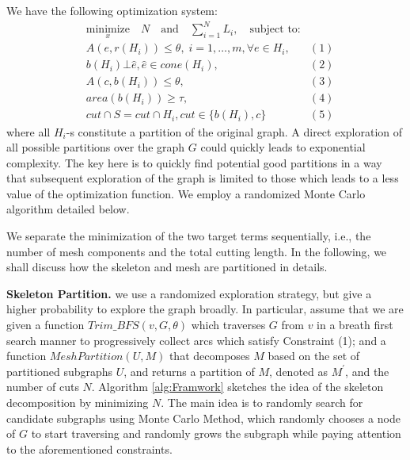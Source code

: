 We have the following optimization system:
\begin{equation*}
\begin{aligned}
& \underset{x}{\text{minimize}} \quad N \quad \text{and} \quad \sum_{i=1}^N{L_i},
\quad \text{subject to:} \\
& A(e, r(H_i)) \leq \theta, \; i = 1, \ldots, m, \forall e \in H_i, & (1)\\
& b(H_i) \bot \hat{e}, \hat{e} \in cone(H_i), & (2)\\
& A(c, b(H_i)) \leq \theta, & (3)\\
& area(b(H_i)) \geq \tau, & (4)\\
& cut \cap S = cut \cap H_i, cut \in \{b(H_i), c\}  & (5)
\end{aligned}
\end{equation*}
where all $H_i$-s constitute a partition of the original graph. A direct exploration of all possible partitions over the graph $G$ could quickly leads to exponential complexity. The key here is to quickly find potential good partitions in a way that subsequent exploration of the graph is limited to those which leads to a less value of the optimization function. We employ a randomized Monte Carlo algorithm detailed below.

We separate the minimization of the two target terms sequentially, i.e., the number of mesh components and the total cutting length. In the following, we shall discuss how the skeleton and mesh are partitioned in details.

\textbf{Skeleton Partition.} {\color{red}{To minimize the number of mesh components, we need to provide a proper set of partitioned subgraphs from $S$. For this purpose,}} we use a randomized exploration strategy, but give a higher probability to explore the graph broadly. In particular, assume that we are given a function $Trim\_BFS(v, G, \theta)$ which traverses $G$ from $v$ in a breath first search manner to progressively collect arcs which satisfy Constraint (1); and a function $MeshPartition(U , M)$ that decomposes $M$ based on the set of partitioned subgraphs $U$, and returns a partition of $M$, denoted as $M^{'}$, and the number of cuts $N$. Algorithm \ref{alg:Framwork} sketches the idea of the skeleton decomposition {{by minimizing $N$}}. The main idea is to randomly search for candidate subgraphs using Monte Carlo Method, which randomly chooses a node of $G$ to start traversing and randomly grows the subgraph while paying attention to the aforementioned constraints.

